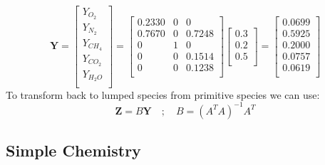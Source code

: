 \begin{equation}\label{eq:transform_to_primitive}
\mathbf{Y}=\left[\begin{array}{c}
       Y_{O_2} \\
       Y_{N_2} \\
       Y_{CH_4} \\
       Y_{CO_2} \\
       Y_{H_2O} \\
     \end{array}\right]
     =\left[\begin{array}{ccc}
     0.2330 & 0 & 0 \\
     0.7670 & 0 & 0.7248 \\
     0 & 1 & 0 \\
     0 & 0 & 0.1514 \\
     0 & 0 & 0.1238 \\
     \end{array}\right]
     \left[\begin{array}{c}
     0.3 \\
     0.2 \\
     0.5 \\
     \end{array}\right]
     =\left[\begin{array}{c}
     0.0699\\
     0.5925\\
     0.2000\\
     0.0757\\
     0.0619\\
     \end{array}\right]
\end{equation}
To transform back to lumped species from primitive species we can use:
\begin{equation}\label{eq:transform_back}
\textbf{Z}=B\textbf{Y} \quad ; \quad B=(A^TA)^{-1}A^T
\end{equation}

\subsection{Simple Chemistry}

